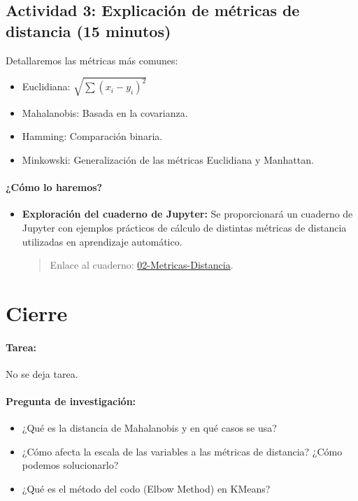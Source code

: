 \documentclass[a4,11pt]{aleph-notas}
\begin{document}
\subsection*{Actividad 3: Explicación de métricas de distancia (15 minutos)}  
Detallaremos las métricas más comunes:
\begin{itemize}
    \item Euclidiana: $\sqrt{\sum (x_i - y_i)^2}$
    \item Mahalanobis: Basada en la covarianza.
    \item Hamming: Comparación binaria.
    \item Minkowski: Generalización de las métricas Euclidiana y Manhattan.
\end{itemize}

\paragraph{¿Cómo lo haremos?}  
\begin{itemize}[leftmargin=*]
    \item \textbf{Exploración del cuaderno de Jupyter:}  
    Se proporcionará un cuaderno de Jupyter con ejemplos prácticos de cálculo de distintas métricas de distancia utilizadas en aprendizaje automático.
    \begin{quote}
        Enlace al cuaderno: \href{https://colab.research.google.com/github/andres-merino/AprendizajeAutomaticoInicial-05-N0105/blob/main/2-Notebooks/02-Metricas-Distancia.ipynb}{02-Metricas-Distancia}.
    \end{quote}
\end{itemize}

\section*{Cierre}

\paragraph{Tarea:}  
    No se deja tarea.

\paragraph{Pregunta de investigación:}  
    \begin{itemize}
        \item ¿Qué es la distancia de Mahalanobis y en qué casos se usa?
        \item ¿Cómo afecta la escala de las variables a las métricas de distancia? ¿Cómo podemos solucionarlo?
        \item ¿Qué es el método del codo (Elbow Method) en KMeans?
    \end{itemize}
\end{document}
